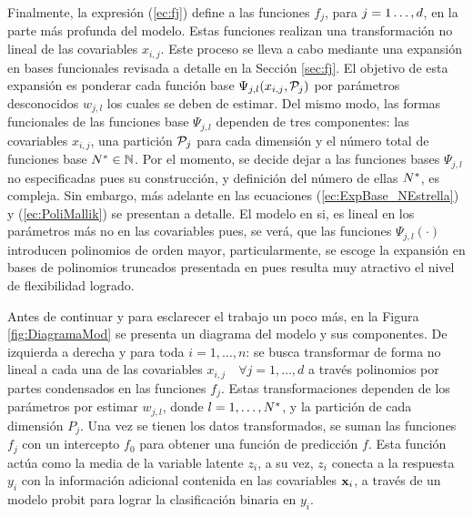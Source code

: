 \documentclass[../Main/Main.tex]{subfiles}
\begin{document}
Finalmente, la expresión (\ref{ec:fj}) define a las funciones $f_j$, para $\junod$, en la parte más profunda del modelo. Estas funciones realizan una transformación no lineal de las covariables $x_{i,j}$. Este proceso se lleva a cabo mediante una expansión en bases funcionales revisada a detalle en la Sección \ref{sec:fj}. El objetivo de esta expansión es ponderar cada función base $\Psi_{j,l}(x_{i,j},\P_j)$ por parámetros desconocidos $w_{j,l}$ los cuales se deben de estimar. Del mismo modo, las formas funcionales de las funciones base $\Psi_{j,l}$ dependen de tres componentes: las covariables $x_{i,j}$, una partición $\P_j$ para cada dimensión y el número total de funciones base $\N\in\mathbb{N}$. 
Por el momento, se decide dejar a las funciones bases $\Psi_{j,l}$ no especificadas pues su construcción, y definición del número de ellas $\N$, es compleja. Sin embargo, más adelante en las ecuaciones (\ref{ec:ExpBase_NEstrella}) y (\ref{ec:PoliMallik}) se presentan a detalle. El modelo en si, es lineal en los parámetros más no en las covariables pues, se verá, que las funciones $\Psi_{j,l}(\cdot)$ introducen polinomios de orden mayor, particularmente, se escoge la expansión en bases de polinomios truncados presentada en \citet{mallik1998automatic} pues resulta muy atractivo el nivel de flexibilidad logrado. 

Antes de continuar y para esclarecer el trabajo un poco más, en la Figura \ref{fig:DiagramaMod} se presenta un diagrama del modelo y  sus componentes. De izquierda a derecha y para toda $i=1,\ldots,n$: se busca transformar de forma no lineal a cada una de las covariables $x_{i,j} \quad \forall j = 1,\ldots,d$ a través polinomios por partes condensados en las funciones $f_j$. Estas transformaciones dependen de los parámetros por estimar $w_{j,l}$, donde $l =1,\ldots,\N$, y la partición de cada dimensión $P_j$. Una vez se tienen los datos transformados, se suman las funciones $f_j$ con un intercepto $f_0$ para obtener una función de predicción $f$. Esta función actúa como la media de la variable latente $z_i$, a su vez, $z_i$ conecta a la respuesta $y_i$ con la información adicional contenida en las covariables $\xni$, a través de un modelo probit para lograr la clasificación binaria en $y_i$. 
\end{document}
